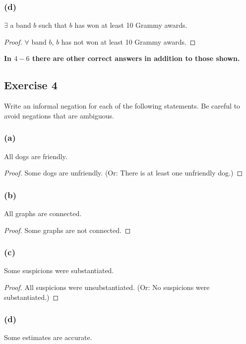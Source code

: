 \documentclass[14pt]{extarticle}
\newcommand{\fa}{\forall}
\newcommand{\te}{\exists}
\begin{document}
\subsubsection{(d)}
$\te$ a band $b$ such that $b$ has won at least 10 Grammy awards.

\begin{proof}
$\fa$ band $b$, $b$ has not won at least 10 Grammy awards.
\end{proof}

{\bf \color{cyan} In $4-6$ there are other correct answers in addition to those shown.}

\subsection{Exercise 4}
Write an informal negation for each of the following statements. Be careful to avoid negations that are ambiguous.

\subsubsection{(a)}
All dogs are friendly.

\begin{proof}
Some dogs are unfriendly. (Or: There is at least one
unfriendly dog.)

\end{proof}

\subsubsection{(b)}
All graphs are connected.

\begin{proof}
Some graphs are not connected.
\end{proof}

\subsubsection{(c)}
Some suspicions were substantiated.

\begin{proof}
All suspicions were unsubstantiated. (Or: No suspicions were substantiated.)
\end{proof}

\subsubsection{(d)}
Some estimates are accurate.
\end{document}
